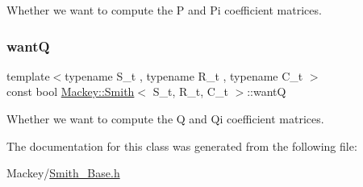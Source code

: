 Whether we want to compute the P and Pi coefficient matrices. 

\mbox{\label{classMackey_1_1Smith_a10ec727132ca15eee9dac0522d617a50}} 
\subsubsection{\texorpdfstring{wantQ}{wantQ}}
{\footnotesize\ttfamily template$<$typename S\+\_\+t , typename R\+\_\+t , typename C\+\_\+t $>$ \\
const bool \hyperlink{classMackey_1_1Smith}{Mackey\+::\+Smith}$<$ S\+\_\+t, R\+\_\+t, C\+\_\+t $>$\+::wantQ\hspace{0.3cm}{\ttfamily [protected]}}



Whether we want to compute the Q and Qi coefficient matrices. 



The documentation for this class was generated from the following file\+:\begin{DoxyCompactItemize}
\item 
Mackey/\hyperlink{Smith__Base_8h}{Smith\+\_\+\+Base.\+h}\end{DoxyCompactItemize}

